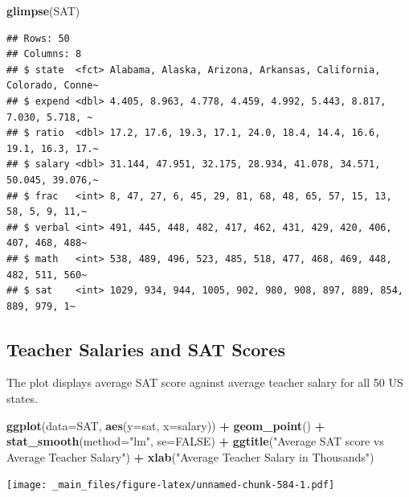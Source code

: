 \documentclass[]{book}
\newenvironment{Shaded}{\begin{snugshade}}{\end{snugshade}}
\newcommand{\KeywordTok}[1]{\textcolor[rgb]{0.13,0.29,0.53}{\textbf{#1}}}
\newcommand{\DataTypeTok}[1]{\textcolor[rgb]{0.13,0.29,0.53}{#1}}
\newcommand{\StringTok}[1]{\textcolor[rgb]{0.31,0.60,0.02}{#1}}
\newcommand{\OtherTok}[1]{\textcolor[rgb]{0.56,0.35,0.01}{#1}}
\newcommand{\OperatorTok}[1]{\textcolor[rgb]{0.81,0.36,0.00}{\textbf{#1}}}
\newcommand{\NormalTok}[1]{#1}
\begin{document}
\begin{Shaded}
\begin{Highlighting}[]
\KeywordTok{glimpse}\NormalTok{(SAT)}
\end{Highlighting}
\end{Shaded}

\begin{verbatim}
## Rows: 50
## Columns: 8
## $ state  <fct> Alabama, Alaska, Arizona, Arkansas, California, Colorado, Conne~
## $ expend <dbl> 4.405, 8.963, 4.778, 4.459, 4.992, 5.443, 8.817, 7.030, 5.718, ~
## $ ratio  <dbl> 17.2, 17.6, 19.3, 17.1, 24.0, 18.4, 14.4, 16.6, 19.1, 16.3, 17.~
## $ salary <dbl> 31.144, 47.951, 32.175, 28.934, 41.078, 34.571, 50.045, 39.076,~
## $ frac   <int> 8, 47, 27, 6, 45, 29, 81, 68, 48, 65, 57, 15, 13, 58, 5, 9, 11,~
## $ verbal <int> 491, 445, 448, 482, 417, 462, 431, 429, 420, 406, 407, 468, 488~
## $ math   <int> 538, 489, 496, 523, 485, 518, 477, 468, 469, 448, 482, 511, 560~
## $ sat    <int> 1029, 934, 944, 1005, 902, 980, 908, 897, 889, 854, 889, 979, 1~
\end{verbatim}

\subsection{Teacher Salaries and SAT
Scores}\label{teacher-salaries-and-sat-scores}

The plot displays average SAT score against average teacher salary for
all 50 US states.

\begin{Shaded}
\begin{Highlighting}[]
\KeywordTok{ggplot}\NormalTok{(}\DataTypeTok{data=}\NormalTok{SAT, }\KeywordTok{aes}\NormalTok{(}\DataTypeTok{y=}\NormalTok{sat, }\DataTypeTok{x=}\NormalTok{salary)) }\OperatorTok{+}\StringTok{ }\KeywordTok{geom_point}\NormalTok{() }\OperatorTok{+}
\StringTok{  }\KeywordTok{stat_smooth}\NormalTok{(}\DataTypeTok{method=}\StringTok{"lm"}\NormalTok{, }\DataTypeTok{se=}\OtherTok{FALSE}\NormalTok{) }\OperatorTok{+}\StringTok{ }
\StringTok{  }\KeywordTok{ggtitle}\NormalTok{(}\StringTok{"Average SAT score vs Average Teacher Salary"}\NormalTok{) }\OperatorTok{+}\StringTok{ }
\StringTok{  }\KeywordTok{xlab}\NormalTok{(}\StringTok{"Average Teacher Salary in Thousands"}\NormalTok{) }
\end{Highlighting}
\end{Shaded}

\texttt{[image: \_main\_files/figure-latex/unnamed-chunk-584-1.pdf]}
\end{document}
